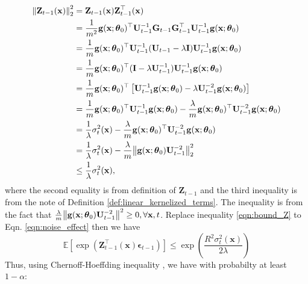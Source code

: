 \begin{align}
        \norm{\mathbf{Z}_{t-1}(\mathbf{x})}^2_2 & = \mathbf{Z}_{t-1}(\mathbf{x}) \mathbf{Z}_{t-1}^\top(\mathbf{x}) \nonumber
\\
        & = \frac{1}{m^2} \mathbf{g}(\mathbf{x}; \boldsymbol{\theta}_0)^\top \mathbf{U}^{-1}_{t-1} \mathbf{G}_{t-1} \mathbf{G}_{t-1}^\top \mathbf{U}^{-1}_{t-1}\mathbf{g}(\mathbf{x}; \boldsymbol{\theta}_0) \nonumber
\\
        & = \frac{1}{m} \mathbf{g}(\mathbf{x}; \boldsymbol{\theta}_0)^\top \mathbf{U}^{-1}_{t-1} (\mathbf{U}_{t-1} - \lambda\mathbf{I}) \mathbf{U}^{-1}_{t-1}\mathbf{g}(\mathbf{x}; \boldsymbol{\theta}_0)  \nonumber
\\
        & = \frac{1}{m}\mathbf{g}(\mathbf{x}; \boldsymbol{\theta}_0)^\top  (\mathbf{I} - \lambda\mathbf{U}^{-1}_{t-1}) \mathbf{U}^{-1}_{t-1} \mathbf{g}(\mathbf{x}; \boldsymbol{\theta}_0) \nonumber
\\
        & = \frac{1}{m} \mathbf{g}(\mathbf{x}; \boldsymbol{\theta}_0)^\top \left[ \mathbf{U}^{-1}_{t-1} \mathbf{g}(\mathbf{x}; \boldsymbol{\theta}_0) - \lambda \mathbf{U}^{-2}_{t-1}\mathbf{g}(\mathbf{x}; \boldsymbol{\theta}_0) \right]  \nonumber
\\ 
        & = \frac{1}{m} \mathbf{g}(\mathbf{x}; \boldsymbol{\theta}_0)^\top \mathbf{U}^{-1}_{t-1} \mathbf{g}(\mathbf{x}; \boldsymbol{\theta}_0) - \frac{\lambda}{m} \mathbf{g}(\mathbf{x}; \boldsymbol{\theta}_0)^\top \mathbf{U}^{-2}_{t-1}\mathbf{g}(\mathbf{x}; \boldsymbol{\theta}_0) \nonumber
\\
        & = \frac{1}{\lambda}\sigma_t^2(\mathbf{x}) - \frac{\lambda}{m} \mathbf{g}(\mathbf{x}; \boldsymbol{\theta}_0)^\top \mathbf{U}^{-2}_{t-1}\mathbf{g}(\mathbf{x}; \boldsymbol{\theta}_0) \nonumber
\\ 
        & = \frac{1}{\lambda}\sigma_t^2(\mathbf{x}) - \frac{\lambda}{m} \norm{\mathbf{g}(\mathbf{x}; \boldsymbol{\theta}_0) \mathbf{U}^{-2}_{t-1}}^2_2  \nonumber
\\
        & \leq \frac{1}{\lambda} \sigma_t^2(\mathbf{x}), \label{eqn:bound_Z}
\end{align}
where the second equality is from definition of $\mathbf{Z}_{t-1}$ and the third inequality is from the note of Definition \ref{def:linear_kernelized_terms}.  The inequality is from the fact that  $\frac{\lambda}{m} \norm{\mathbf{g}(\mathbf{x}; \boldsymbol{\theta}_0) \mathbf{U}^{-2}_{t-1}}^2 \ge 0, \forall \mathbf{x},t$. Replace inequality \eqref{eqn:bound_Z} to Eqn. \eqref{eqn:noise_effect} then we have 
\[ \mathbb E \left[\exp \left( \mathbf{Z}_{t-1}^\top(\mathbf{x})\boldsymbol{\epsilon}_{t-1}   \right) \right] \leq \exp (\frac{R^2\sigma_t^2(\mathbf{x})}{2\lambda}) \]
Thus, using Chernoff-Hoeffding inequality \citep{antonini2008convergence}, we have with probabilty at least $1-\alpha$: 

